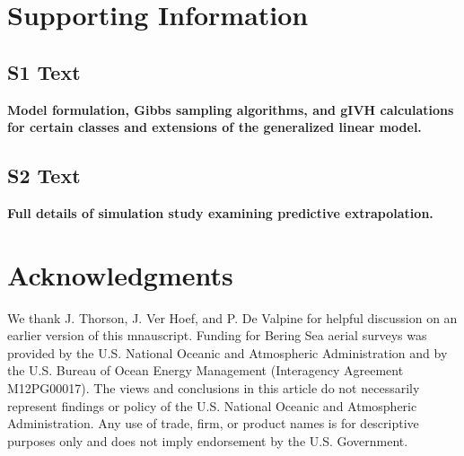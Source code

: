 \documentclass[10pt,letterpaper]{article}
\begin{document}
\section*{Supporting Information}


\subsection*{S1 Text}
\label{S1_Text}
{\bf Model formulation, Gibbs sampling algorithms, and gIVH calculations for certain classes and extensions of the generalized linear model.}

\subsection*{S2 Text}
\label{S2_Text}
{\bf Full details of simulation study examining predictive extrapolation.}

\section*{Acknowledgments}
We thank J. Thorson, J. Ver Hoef, and P. De Valpine for helpful discussion on an earlier version of this mnauscript.  Funding
for Bering Sea aerial surveys was provided by the U.S. National Oceanic and Atmospheric
Administration and by the U.S. Bureau of Ocean Energy Management (Interagency
Agreement M12PG00017).  The views and conclusions in this article do not necessarily represent findings or policy of the U.S. National Oceanic and Atmospheric Administration.  Any use of trade, firm, or product names is for descriptive purposes only and does not imply endorsement by the U.S. Government.

\nolinenumbers

%
%
%



\end{document}
